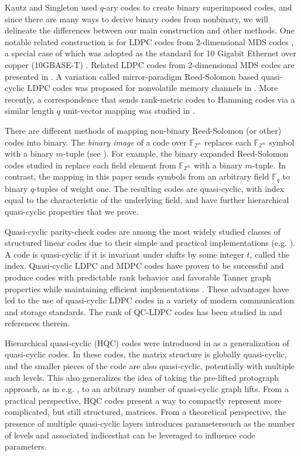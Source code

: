 \documentclass[11pt]{amsart}
\theoremstyle{definition}
\newcommand{\0}{\mathbf{0}}
\begin{document}
Kautz and Singleton used $q$-ary codes to create binary superimposed codes, and since there are many ways to derive binary codes from nonbinary, we will delineate the differences between our main construction and other methods. One notable related construction is for LDPC codes from 2-dimensional MDS codes \cite{chen2010two}, a special case of which was adopted as the standard for 10 Gigabit Ethernet over copper (10GBASE-T) \cite{lim2012novel}. Related LDPC codes from 2-dimensional MDS codes are presented in \cite{djurdjevic2003class, xu2006construction}. A variation called mirror-paradigm Reed-Solomon based quasi-cyclic LDPC codes was proposed for nonvolatile memory channels in \cite{lim2012novel}. More recently, a correspondence that sends rank-metric codes to Hamming codes via a similar length $q$ unit-vector mapping was studied in \cite{astore2024geometric}. 

There are different methods of mapping non-binary Reed-Solomon (or other) codes into binary. The \textit{binary image} of a code over $\mathbb{F}_{2^m}$ replaces each $\mathbb{F}_{2^m}$ symbol with a binary $m$-tuple (see \cite{macwilliams1977theory}). For example, the binary expanded Reed-Solomon codes studied in \cite{bidan2007some} replace each field element from $\mathbb{F}_{2^m}$ with a binary $m$-tuple. In contrast, the mapping in this paper sends symbols from an arbitrary field $\mathbb{F}_q$ to binary $q$-tuples of weight one. The resulting codes are quasi-cyclic, with index  equal to the characteristic of the underlying field, and have further hierarchical quasi-cyclic properties that we prove.

Quasi-cyclic parity-check codes are among the most widely studied classes of structured linear codes due to their simple and practical implementations (e.g. \cite{karimi2013girth, wang2013hierarchical, myung2005quasi, li2018algebra}). A code is quasi-cyclic if it is invariant under shifts by some integer $t$, called the index. Quasi-cyclic LDPC and MDPC codes have proven to be successful and produce codes with predictable rank behavior and favorable Tanner graph properties while maintaining efficient implementations \cite{fossorier2004quasicyclic}. These advantages have led to the use of quasi-cyclic LDPC codes in a variety of modern communication and storage standards. The rank of QC-LDPC codes has been studied in \cite{yang2018rank, smarandache2022using} and references therein.

Hierarchical quasi-cyclic (HQC) codes were introduced in \cite{wang2013hierarchical} as a generalization of quasi-cyclic codes. In these codes, the matrix structure is globally quasi-cyclic, and the smaller pieces of the code are also quasi-cyclic, potentially with multiple such levels. This also generalizes the idea of taking the pre-lifted protograph approach, as in e.g. \cite{mitchell2014quasi, li2025high}, to an arbitrary number of quasi-cyclic graph lifts. From a practical perspective, HQC codes present a way to compactly represent more complicated, but still structured, matrices. From a theoretical perspective, the presence of multiple quasi-cyclic layers introduces parameters\textemdash such as the number of levels and associated indices\textemdash that can be leveraged to influence code parameters.
\end{document}
